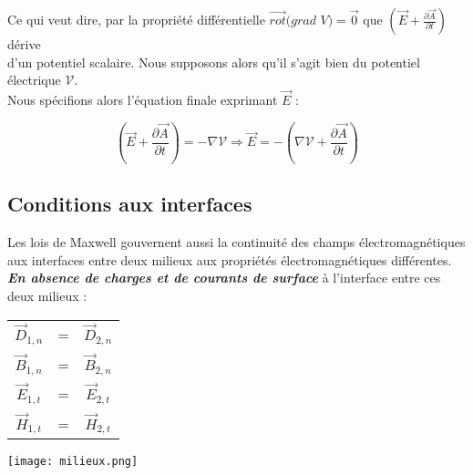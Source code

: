 \documentclass[a4paper,12pt]{article}
\begin{document}
Ce qui veut dire, par la propriété différentielle $\vec{rot}(grad$ $V) = \vec{0}$ que $(\vec{E} + \frac{\partial \vec{A}}{\partial t})$ dérive \\d'un potentiel scalaire.
Nous supposons alors qu'il s'agit bien du potentiel électrique $\mathcal{V}$. \\Nous spécifions alors l'équation finale exprimant $\vec{E}$ : 

\[(\vec{E} + \frac{\partial \vec{A}}{\partial t}) = - \nabla \mathcal{V} \Rightarrow \vec{E} = - (\nabla \mathcal{V} + \frac{\partial \vec{A}}{\partial t}) \]
 
 
 \newpage
 
 \subsection{Conditions aux interfaces}
 
 Les lois de Maxwell gouvernent aussi la continuité des champs électromagnétiques aux interfaces entre deux milieux aux propriétés électromagnétiques différentes. \\
 \textit{\textbf{En absence de charges et de courants de surface}} à l'interface entre ces deux milieux : 
 
 \begin{center}
 
 \begin{tabular}{|ccc|}
 
 \hline
 
 $\vec{D}_{1,n} $ & = & $\vec{D}_{2,n} $ \\ 
 
 $\vec{B}_{1,n} $ & = & $\vec{B}_{2,n} $ \\ 
 
 $\vec{E}_{1,t} $ & = & $\vec{E}_{2,t} $ \\ 
 
 $\vec{H}_{1,t} $ & = & $\vec{H}_{2,t} $ \\ 
 
 \hline
 
 \end{tabular}
 
 
 \texttt{[image: milieux.png]} 
 
 \end{center}
 
\end{document}
